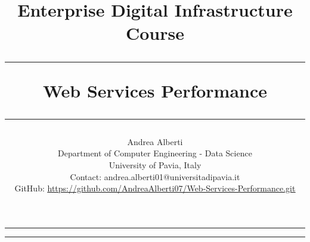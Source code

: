 \documentclass[a4paper,10pt]{article}
\title{\Large {Enterprise Digital Infrastructure Course} \vspace{0.2cm}
     \rule{\textwidth}{0.3pt} \vspace{0.0cm} %
     \textbf{Web Services Performance} \vspace{0.0cm} %
     \rule{\textwidth}{0.3pt}}
\author{Andrea Alberti \vspace{0.1cm}\\
        \small Department of Computer Engineering - Data Science \vspace{0.1cm}\\
        \small University of Pavia, Italy \vspace{0.1cm}\\
        \small Contact: andrea.alberti01@universitadipavia.it\\
        \small GitHub: \href{https://github.com/AndreaAlberti07/Web-Services-Performance.git}{\underline{https://github.com/AndreaAlberti07/Web-Services-Performance.git}}\vspace{0.5cm}}
\begin{document}

\begin{titlepage}
        \maketitle 
        \thispagestyle{empty} 
\begin{multicols*}{2}

\hrule
\tableofcontents
\newcolumn
\hrule
\begin{abstract}
        \noindent
        
\end{abstract}


        
\end{multicols*}
\end{titlepage}


\newpage
\listoffigures
\listoftables
\end{document}
